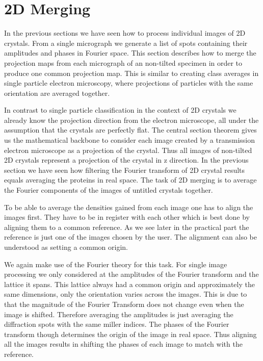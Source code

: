 \section{2D Merging}
\label{sec:2d_merging}

In the previous sections we have seen how to process individual images of 2D crystals. From a single micrograph we generate a list of spots containing their amplitudes and phases in Fourier space. This section describes how to merge the projection maps from each micrograph of an non-tilted specimen in order to produce one common projection map. This is similar to creating class averages in single particle electron microscopy, where projections of particles with the same orientation are averaged together.

In contrast to single particle classification in the context of 2D crystals we already know the projection direction from the electron microscope, all under the assumption that the crystals are perfectly flat. The central section theorem gives us the mathematical backbone to consider each image created by a transmission electron microscope as a projection of the crystal. Thus all images of non-tilted 2D crystals represent a projection of the crystal in z direction. In the previous section we have seen how filtering the Fourier transform of 2D crystal results equals averaging the proteins in real space. The task of 2D merging is to average the Fourier components of the images of untitled crystals together.

To be able to average the densities gained from each image one has to align the images first. They have to be in register with each other which is best done by aligning them to a common reference. As we see later in the practical part the reference is just one of the images chosen by the user. The alignment can also be understood as setting a common origin. 

We again make use of the Fourier theory for this task. For  single image processing we only considered at the amplitudes of the Fourier transform and the lattice it spans. This lattice always had a common origin and approximately the same dimensions, only the orientation varies across the images. This is due to that the magnitude of the Fourier Transform does not change even when the image is shifted. Therefore averaging the amplitudes is just averaging the diffraction spots with the same miller indices. The phases of the Fourier transform though determines the origin of the image in real space. Thus aligning all the images  results in shifting the phases of each image to match with the reference.

